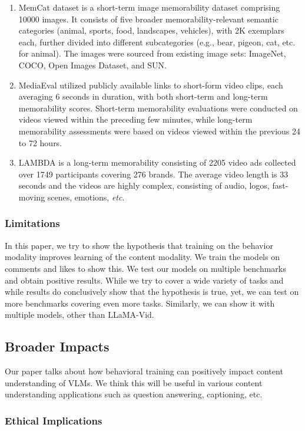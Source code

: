 \begin{enumerate}
         \item MemCat \cite{goetschalckx2019memcat} dataset is a short-term image memorability dataset comprising 10000 images. It consists of five broader memorability-relevant semantic categories (animal, sports, food, landscapes, vehicles), with 2K exemplars each, further divided into different subcategories (e.g., bear, pigeon, cat, etc. for animal). The images were sourced from existing image sets: ImageNet, COCO, Open Images Dataset, and SUN. 
            \item MediaEval \cite{Kiziltepe2021} utilized publicly available links to short-form video clips, each averaging 6 seconds in duration, with both short-term and long-term memorability scores. Short-term memorability evaluations were conducted on videos viewed within the preceding few minutes, while long-term memorability assessments were based on videos viewed within the previous 24 to 72 hours.
            \item LAMBDA \cite{si2023long} is a long-term memorability consisting of 2205 video ads collected over 1749 participants covering 276 brands. The average video length is 33 seconds and the videos are highly complex, consisting of audio, logos, fast-moving scenes, emotions, \textit{etc}.
\end{enumerate}


\subsubsection{Limitations}
In this paper, we try to show the hypothesis that training on the behavior modality improves learning of the content modality. We train the models on comments and likes to show this. We test our models on multiple benchmarks and obtain positive results. While we try to cover a wide variety of tasks and while results do conclusively show that the hypothesis is true, yet, we can test on more benchmarks covering even more tasks. Similarly, we can show it with multiple models, other than LLaMA-Vid.


\subsection{Broader Impacts}
Our paper talks about how behavioral training can positively impact content understanding of VLMs. We think this will be useful in various content understanding applications such as question answering, captioning, etc. 

\subsubsection{Ethical Implications}

